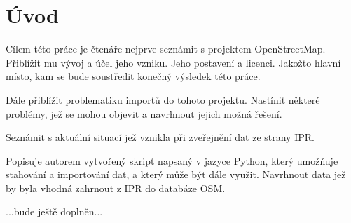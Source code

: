 \chapter{Úvod}
\label{1-uvod}

Cílem této práce je čtenáře nejprve seznámit s projektem OpenStreetMap.
Přiblížit mu vývoj a účel jeho vzniku. Jeho postavení a licenci.
Jakožto hlavní místo, kam se bude soustředit konečný výsledek této práce.

Dále přiblížit problematiku importů do tohoto projektu. Nastínit některé problémy, jež se mohou objevit a navrhnout jejich možná řešení. 

Seznámit s aktuální situací jež vznikla při zveřejnění dat ze strany IPR.

Popisuje autorem vytvořený skript napsaný v jazyce Python, který umožňuje stahování a importování dat, a který může být dále využit. 
Navrhnout data jež by byla vhodná zahrnout z IPR do databáze OSM.

...bude ještě doplněn...


